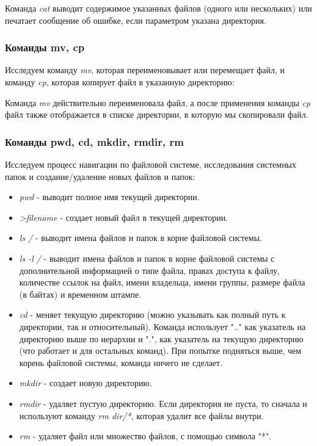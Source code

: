 \documentclass[14pt,a4paper,report]{report}
\begin{document}
Команда \emph{cat} выводит содержимое указанных файлов (одного или нескольких) или печатает сообщение об ошибке, если параметром указана директория.

\subsubsection{Команды mv, cp}

Исследуем команду \emph{mv}, которая переименовывает или перемещает файл, и команду \emph{cp}, которая копирует файл в указанную директорию:



Команда \emph{mv} действительно переименовала файл, а после применения команды \emph{cp} файл также отображается в списке директории, в которую мы скопировали файл.

\subsubsection{Команды pwd, cd, mkdir, rmdir, rm}

Исследуем процесс навигации по файловой системе, исследования системных папок и создание/удаление новых файлов и папок:



\begin{itemize}
	\item \emph{pwd} - выводит полное имя текущей директории.
	\item \emph{>filename} - создает новый файл в текущей директории.
	\item \emph{ls /} - выводит имена файлов и папок в корне файловой системы.
	\item \emph{ls -l /} - выводит имена файлов и папок в корне файловой системы с дополнительной информацией о типе файла, правах доступа к файлу, количестве ссылок на файл, имени владельца, имени группы, размере файла (в байтах) и временном штампе.
	\item \emph{cd} - меняет текущую директорию (можно указывать как полный путь к директории, так и относительный). Команда использует ".." как указатель на директорию выше по иерархии и ".", как указатель на текущую директорию (что работает и для остальных команд). При попытке подняться выше, чем корень файловой системы, команда ничего не сделает.
	\item \emph{mkdir} - создает новую директорию.
	\item \emph{rmdir} - удаляет пустую директорию. Если директория не пуста, то сначала н используют команду \emph{rm dir/*}, которая удалит все файлы внутри.
	\item \emph{rm} - удаляет файл или множество файлов, с помощью символа "*".
\end{itemize}
\end{document}

